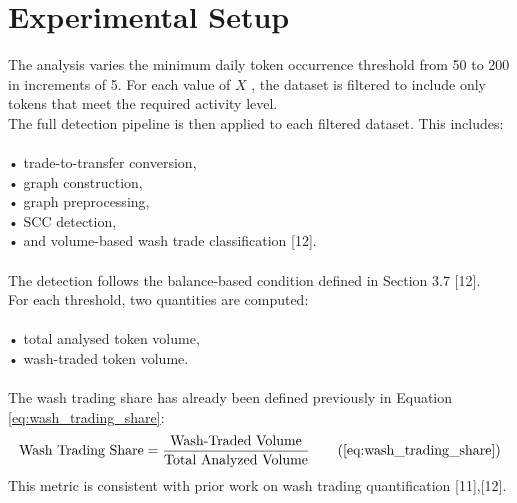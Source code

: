 \documentclass[language=english,thesis=bachelor,nosecondtitle,faculty=cb,onesided,12pt]{hsmw-thesis}
\begin{document}
	\section{Experimental Setup}
The analysis varies the minimum daily token occurrence threshold from 50 to 200 in increments of 5. For each value of $X$ , the dataset is filtered to include only tokens that meet the required activity level.\\
The full detection pipeline is then applied to each filtered dataset. This includes:\\
\\
•	trade-to-transfer conversion,\\
•	graph construction,\\
•	graph preprocessing,\\
•	SCC detection,\\
•	and volume-based wash trade classification [12].\\
\\
The detection follows the balance-based condition defined in Section 3.7 [12].\\
For each threshold, two quantities are computed:\\
\\
•	total analysed token volume,\\
•	wash-traded token volume.\\
\\
The wash trading share has already been defined previously in Equation \ref{eq:wash_trading_share}:\\
\begin{equation}
    \text{Wash Trading Share} = \frac{\text{Wash-Traded Volume}}{\text{Total Analyzed Volume}}
    \tag{\ref{eq:wash_trading_share}}
\end{equation}
This metric is consistent with prior work on wash trading quantification [11],[12].
\end{document}
